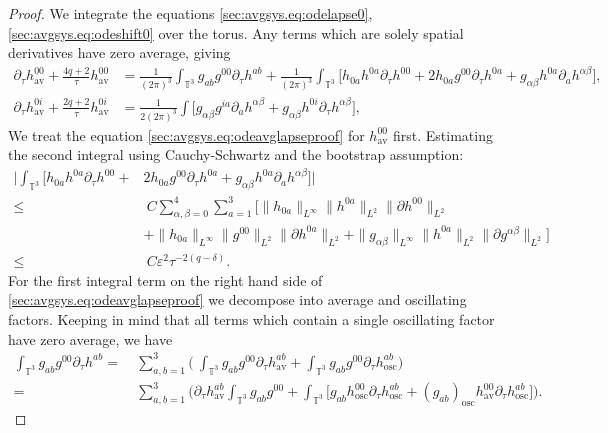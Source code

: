 \documentclass{article}
\newcommand{\TT}{\mathbb{T}}
\newcommand{\osc}{\mathrm{osc}}
\newcommand{\av}{\mathrm{av}}
\newcommand{\ve}{\varepsilon}
\newcommand{\pa}{\partial}
\begin{document}
\begin{proof}
We integrate the equations \eqref{sec:avgsys.eq:odelapse0}, \eqref{sec:avgsys.eq:odeshift0} over the torus. Any terms which are solely spatial derivatives have zero average, giving
\begin{subequations}\label{sec:avgsys.eq:odeavglapseshiftproof}
    \begin{align}
        \pa_\tau h_{\av}^{00} +  \frac{4q+2}{\tau}  h_{\av}^{00} &=  \frac{1}{(2\pi)^3}\int_{\TT^3}g_{ab}g^{00}\pa_\tau  h^{ab} + \frac{1}{(2\pi)^3}\int_{\TT^3}\Big[h_{0a} h^{0a}\pa_\tau  h^{00} + 2 h_{0a}g^{00}\pa_\tau  h^{0a}+g_{\alpha\beta} h^{0a}\pa_a  h^{\alpha\beta}\Big]\label{sec:avgsys.eq:odeavglapseproof},\\
        \pa_\tau   h_{\av}^{0i} + \frac{2q+2}{\tau} h_{\av}^{0i} &= \frac{1}{2(2\pi)^3}\int[g_{\alpha\beta}g^{ia}\pa_a  h^{\alpha\beta} +g_{\alpha\beta} h^{0i}\pa_\tau  h^{\alpha\beta}\Big],\label{sec:avgsys.eq:odeavgshiftproof}
    \end{align}
\end{subequations}
We treat the equation \eqref{sec:avgsys.eq:odeavglapseproof} for $h_{\av}^{00}$ first. Estimating the second integral using Cauchy-Schwartz and the bootstrap assumption:
\begin{align}
    \Big|\int_{\TT^3}\Big[ h_{0a} h^{0a}\pa_\tau  h^{00} +&2 h_{0a}g^{00}\pa_\tau  h^{0a}+g_{\alpha\beta} h^{0a}\pa_a  h^{\alpha\beta}\Big]\Big|\nonumber\\
    \leq&\> C\sum_{\alpha,\beta = 0}^4\sum_{a=1}^3\Big[\| h_{0a}\|_{L^\infty}\| h^{0a}\|_{L^2}\|\pa  h^{00}\|_{L^2}\nonumber\\
    &+\| h_{0a}\|_{L^\infty}\|g^{00}\|_{L^2}\|\pa  h^{0a}\|_{L^2}+  \|g_{\alpha\beta}\|_{L^\infty}\| h^{0a}\|_{L^2}\|\pa g^{\alpha\beta}\|_{L^2}\Big]\nonumber\\
    \leq &\>C\ve^2\tau^{-2(q-\delta)}.\label{sec:avgsys.eq:odeavglapseerror1}
\end{align}
For the first integral term on the right hand side of \eqref{sec:avgsys.eq:odeavglapseproof} we decompose into average and oscillating factors. Keeping in mind that all terms which contain a single oscillating factor have zero average, we have 
\begin{align}
    \int_{\TT^3}g_{ab}g^{00}\pa_\tau  h^{ab} =&\> \sum_{a,b=1}^3\Big(\>\int_{\TT^3}g_{ab}g^{00}\pa_\tau h_{\av}^{ab} + \int_{\TT^3}g_{ab}g^{00}\pa_\tau h_{\osc}^{ab}\Big)\nonumber\\
    =&\> \sum_{a,b=1}^3\Big(\pa_\tau h_{\av}^{ab}\int_{\TT^3}g_{ab}g^{00} + \int_{\TT^3}\Big[g_{ab}h_{\osc}^{00} \pa_\tau h_{\osc}^{ab} + (g_{ab})_{\osc} h_{\av}^{00}\pa_\tau h_{\osc}^{ab}\Big]\Big).

\end{align}
\end{proof}
\end{document}
